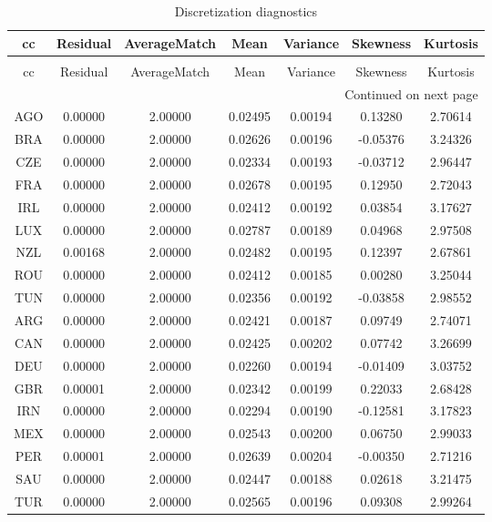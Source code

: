\begin{longtable}{c c c c c c c}
\caption{Discretization diagnostics} \label{tab:discret_diagn} \\
\toprule
cc & Residual & AverageMatch & Mean & Variance & Skewness & Kurtosis \\
\midrule
\endfirsthead
\caption[]{Discretization diagnostics} \\
\toprule
cc & Residual & AverageMatch & Mean & Variance & Skewness & Kurtosis \\
\midrule
\endhead
\midrule
\multicolumn{7}{r}{Continued on next page} \\
\midrule
\endfoot
\bottomrule
\endlastfoot
AGO & 0.00000 & 2.00000 & 0.02495 & 0.00194 & 0.13280 & 2.70614 \\
BRA & 0.00000 & 2.00000 & 0.02626 & 0.00196 & -0.05376 & 3.24326 \\
CZE & 0.00000 & 2.00000 & 0.02334 & 0.00193 & -0.03712 & 2.96447 \\
FRA & 0.00000 & 2.00000 & 0.02678 & 0.00195 & 0.12950 & 2.72043 \\
IRL & 0.00000 & 2.00000 & 0.02412 & 0.00192 & 0.03854 & 3.17627 \\
LUX & 0.00000 & 2.00000 & 0.02787 & 0.00189 & 0.04968 & 2.97508 \\
NZL & 0.00168 & 2.00000 & 0.02482 & 0.00195 & 0.12397 & 2.67861 \\
ROU & 0.00000 & 2.00000 & 0.02412 & 0.00185 & 0.00280 & 3.25044 \\
TUN & 0.00000 & 2.00000 & 0.02356 & 0.00192 & -0.03858 & 2.98552 \\
ARG & 0.00000 & 2.00000 & 0.02421 & 0.00187 & 0.09749 & 2.74071 \\
CAN & 0.00000 & 2.00000 & 0.02425 & 0.00202 & 0.07742 & 3.26699 \\
DEU & 0.00000 & 2.00000 & 0.02260 & 0.00194 & -0.01409 & 3.03752 \\
GBR & 0.00001 & 2.00000 & 0.02342 & 0.00199 & 0.22033 & 2.68428 \\
IRN & 0.00000 & 2.00000 & 0.02294 & 0.00190 & -0.12581 & 3.17823 \\
MEX & 0.00000 & 2.00000 & 0.02543 & 0.00200 & 0.06750 & 2.99033 \\
PER & 0.00001 & 2.00000 & 0.02639 & 0.00204 & -0.00350 & 2.71216 \\
SAU & 0.00000 & 2.00000 & 0.02447 & 0.00188 & 0.02618 & 3.21475 \\
TUR & 0.00000 & 2.00000 & 0.02565 & 0.00196 & 0.09308 & 2.99264 \\

\end{longtable}
